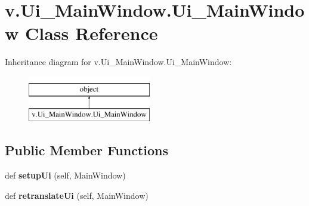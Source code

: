 \hypertarget{classv_1_1_ui___main_window_1_1_ui___main_window}{}\section{v.\+Ui\+\_\+\+Main\+Window.\+Ui\+\_\+\+Main\+Window Class Reference}
\label{classv_1_1_ui___main_window_1_1_ui___main_window}
Inheritance diagram for v.\+Ui\+\_\+\+Main\+Window.\+Ui\+\_\+\+Main\+Window\+:\begin{figure}[H]
\begin{center}
\leavevmode
\includegraphics[height=2.000000cm]{classv_1_1_ui___main_window_1_1_ui___main_window}
\end{center}
\end{figure}
\subsection*{Public Member Functions}
\begin{DoxyCompactItemize}
\item 
\hypertarget{classv_1_1_ui___main_window_1_1_ui___main_window_a66237e86082cae148baed41efa71ed80}{}def {\bfseries setup\+Ui} (self, Main\+Window)\label{classv_1_1_ui___main_window_1_1_ui___main_window_a66237e86082cae148baed41efa71ed80}

\item 
\hypertarget{classv_1_1_ui___main_window_1_1_ui___main_window_aeb400c0fb7ae1899f7777067fa6eb355}{}def {\bfseries retranslate\+Ui} (self, Main\+Window)\label{classv_1_1_ui___main_window_1_1_ui___main_window_aeb400c0fb7ae1899f7777067fa6eb355}

\end{DoxyCompactItemize}
